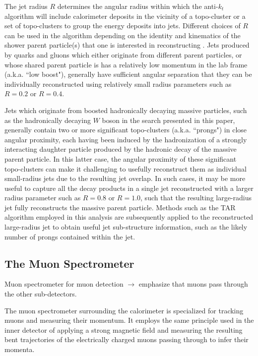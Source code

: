 The jet radius $R$ determines the angular radius within which the anti-$k_t$ algorithm will include calorimeter deposits in the vicinity of a topo-cluster or a set of topo-clusters to group the energy deposits into jets. Different choices of $R$ can be used in the algorithm depending on the identity and kinematics of the shower parent particle(s) that one is interested in reconstructing \cite{jet_reco}. Jets produced by quarks and gluons which either originate from different parent particles, or whose shared parent particle is has a relatively low momentum in the lab frame (a.k.a. ``low boost"), generally have sufficient angular separation that they can be individually reconstructed using relatively small radius parameters such as $R=0.2$ or $R=0.4$. 

Jets which originate from boosted hadronically decaying massive particles, such as the hadronically decaying $W$ boson in the search presented in this paper, generally contain two or more significant topo-clusters (a.k.a. ``prongs") in close angular proximity, each having been induced by the hadronization of a strongly interacting daughter particle produced by the hadronic decay of the massive parent particle. In this latter case, the angular proximity of these significant topo-clusters can make it challenging to usefully reconstruct them as individual small-radius jets due to the resulting jet overlap. In such cases, it may be more useful to capture all the decay products in a single jet reconstructed with a larger radius parameter such as $R=0.8$ or $R=1.0$, such that the resulting large-radius jet fully reconstructs the massive parent particle. Methods such as the TAR algorithm \cite{TAR_algo} employed in this analysis are subsequently applied to the reconstructed large-radius jet to obtain useful jet sub-structure information, such as the likely number of prongs contained within the jet.

\subsection{The Muon Spectrometer}

Muon spectrometer for muon detection $\rightarrow$ emphasize that muons pass through the other sub-detectors. 

The muon spectrometer \cite{atlas} surrounding the calorimeter is specialized for tracking muons and measuring their momentum. It employs the same principle used in the inner detector of applying a strong magnetic field and measuring the resulting bent trajectories of the electrically charged muons passing through to infer their momenta. 

